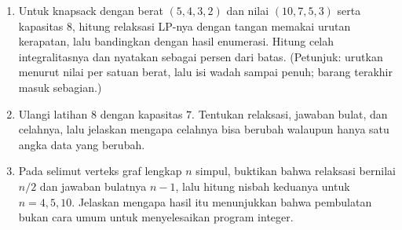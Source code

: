 \begin{latihan}
\begin{enumerate}
  \item Untuk knapsack dengan berat $(5,4,3,2)$ dan nilai $(10,7,5,3)$ serta kapasitas
        $8$, hitung relaksasi LP-nya dengan tangan memakai urutan kerapatan, lalu bandingkan
        dengan hasil enumerasi. Hitung celah integralitasnya dan nyatakan sebagai persen
        dari batas. (Petunjuk: urutkan menurut nilai per satuan berat, lalu isi wadah
        sampai penuh; barang terakhir masuk sebagian.)

  \item Ulangi latihan 8 dengan kapasitas $7$. Tentukan relaksasi, jawaban bulat, dan
        celahnya, lalu jelaskan mengapa celahnya bisa berubah walaupun hanya satu angka
        data yang berubah.

  \item Pada selimut verteks graf lengkap $n$ simpul, buktikan bahwa relaksasi bernilai
        $n/2$ dan jawaban bulatnya $n-1$, lalu hitung nisbah keduanya untuk $n=4,5,10$.
        Jelaskan mengapa hasil itu menunjukkan bahwa pembulatan bukan cara umum untuk
        menyelesaikan program integer.
\end{enumerate}
\end{latihan}

